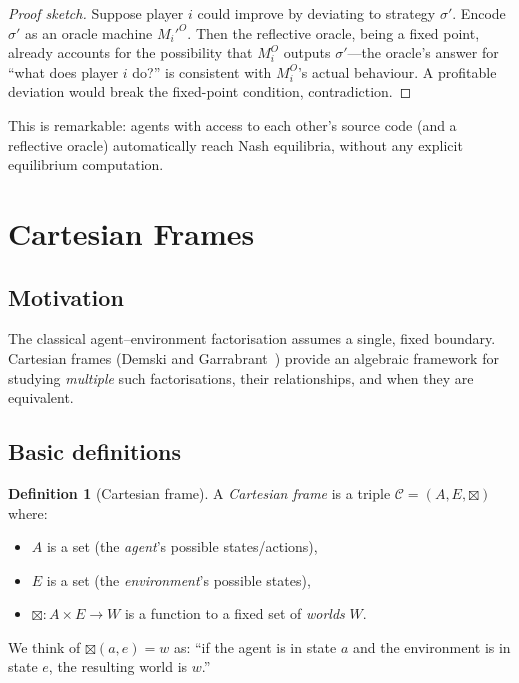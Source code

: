 \documentclass[11pt,a4paper]{article}
\theoremstyle{definition}
\newtheorem{definition}[theorem]{Definition}
\theoremstyle{remark}
\begin{document}
\begin{proof}[Proof sketch]
Suppose player $i$ could improve by deviating to strategy $\sigma'$.
Encode $\sigma'$ as an oracle machine $M_i'^O$.  Then the reflective
oracle, being a fixed point, already accounts for the possibility that
$M_i^O$ outputs $\sigma'$---the oracle's answer for ``what does player
$i$ do?'' is consistent with $M_i^O$'s actual behaviour.  A profitable
deviation would break the fixed-point condition, contradiction.
\end{proof}

This is remarkable: agents with access to each other's source code
(and a reflective oracle) automatically reach Nash equilibria, without
any explicit equilibrium computation.

\section{Cartesian Frames}\label{sec:cartesian-frames}

\subsection{Motivation}

The classical agent--environment factorisation assumes a single, fixed
boundary.  Cartesian frames (Demski and Garrabrant~\cite{demski2020cartesian})
provide an algebraic framework for studying \emph{multiple} such
factorisations, their relationships, and when they are equivalent.

\subsection{Basic definitions}

\begin{definition}[Cartesian frame]
A \emph{Cartesian frame} is a triple $\mathcal{C} = (A, E, \boxtimes)$
where:
\begin{itemize}
  \item $A$ is a set (the \emph{agent}'s possible states/actions),
  \item $E$ is a set (the \emph{environment}'s possible states),
  \item $\boxtimes : A \times E \to W$ is a function to a fixed set of
    \emph{worlds} $W$.
\end{itemize}
We think of $\boxtimes(a, e) = w$ as: ``if the agent is in state $a$
and the environment is in state $e$, the resulting world is $w$.''
\end{definition}
\end{document}
